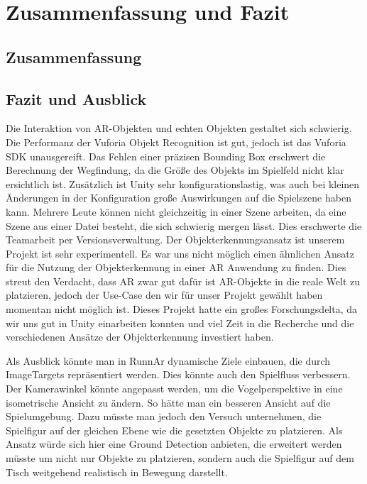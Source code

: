 \chapter{Zusammenfassung und Fazit}
\section{Zusammenfassung}

\section{Fazit und Ausblick}
Die Interaktion von AR-Objekten und echten Objekten gestaltet sich schwierig. Die Performanz der Vuforia Objekt Recognition ist gut, jedoch ist das Vuforia SDK unausgereift. Das Fehlen einer präzisen Bounding Box erschwert die Berechnung der Wegfindung, da die Größe des Objekts im Spielfeld nicht klar ersichtlich ist. Zusätzlich ist Unity sehr konfigurationslastig, was auch bei kleinen Änderungen in der Konfiguration große Auswirkungen auf die Spielszene haben kann.  Mehrere Leute können nicht gleichzeitig in einer Szene arbeiten, da eine Szene aus einer Datei besteht, die sich schwierig mergen lässt. Dies erschwerte die Teamarbeit per Versionsverwaltung. Der Objekterkennungsansatz ist unserem Projekt ist sehr experimentell. Es war uns nicht möglich einen ähnlichen Ansatz für die Nutzung der Objekterkennung in einer AR Anwendung zu finden. Dies streut den Verdacht, dass AR zwar gut dafür ist AR-Objekte in die reale Welt zu platzieren, jedoch der Use-Case den wir für unser Projekt gewählt haben momentan nicht möglich ist. Dieses Projekt hatte ein großes Forschungsdelta, da wir uns gut in Unity einarbeiten konnten und viel Zeit in die Recherche und die verschiedenen Ansätze der Objekterkennung investiert haben. 


Als Ausblick könnte man in RunnAr dynamische Ziele einbauen, die durch ImageTargets repräsentiert werden. Dies könnte auch den Spielfluss verbessern. Der Kamerawinkel könnte angepasst werden, um die Vogelperspektive in eine isometrische Ansicht zu ändern. So hätte man ein besseren Ansicht auf die Spielumgebung. Dazu müsste man jedoch den Versuch unternehmen, die Spielfigur auf der gleichen Ebene wie die gesetzten Objekte zu platzieren. Als Ansatz würde sich hier eine Ground Detection anbieten, die erweitert werden müsste um nicht nur Objekte zu platzieren, sondern auch die Spielfigur auf dem Tisch weitgehend realistisch in Bewegung darstellt.